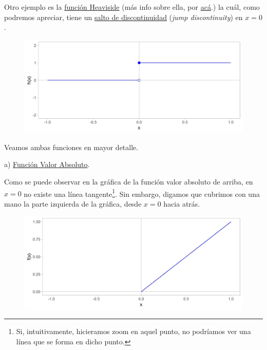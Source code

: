 \documentclass[12pt]{article}
\begin{document}
Otro ejemplo es la \underline{función Heaviside} (más info sobre ella, por \href{https://es.wikipedia.org/wiki/Funci%C3%B3n_escal%C3%B3n_de_Heaviside}{acá}.) la cuál, como podremos apreciar, tiene un \underline{salto de discontinuidad} (\textit{jump discontinuity}) en $x = 0$.

\begin{figure}[hbt!]
\centering
\includegraphics[scale=0.7]{img/heaviside_plot.jpg}
\end{figure}

Veamos ambas funciones en mayor detalle.

\newpage

a) \underline{Función Valor Absoluto}.

Como se puede observar en la gráfica de la función valor absoluto de arriba, en $x = 0$ no existe una línea tangente\footnote{Si, intuitivamente, hicieramos zoom en aquel punto, no podríamos ver una línea que se forma en dicho punto.}. Sin embargo, digamos que cubrimos con una mano la parte izquierda de la gráfica, desde $x = 0$ hacia atrás.

\begin{figure}[hbt!]
\centering
\includegraphics[scale=0.7]{img/abs_fun_right_plot.jpg}
\end{figure}
\end{document}
